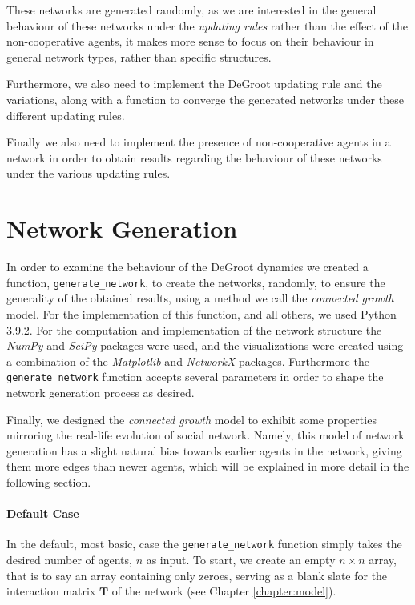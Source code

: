 \documentclass[a4paper, 12pt]{report}
\newcommand{\T}{\bm{T}}
\begin{document}
These networks are generated randomly, as we are interested in the general behaviour of these networks under the \emph{updating rules} rather than the effect of the non-cooperative agents, it makes more sense to focus on their behaviour in general network types, rather than specific structures.

Furthermore, we also need to implement the DeGroot updating rule and the variations, along with a function to converge the generated networks under these different updating rules.

Finally we also need to implement the presence of non-cooperative agents in a network in order to obtain results regarding the behaviour of these networks under the various updating rules. 
\section{Network Generation}
\label{generation:random}

In order to examine the behaviour of the DeGroot dynamics we created a function, \texttt{generate\_network}, to create the networks, randomly, to ensure the generality of the obtained results, using a method we call the \emph{connected growth} model. For the implementation of this function, and all others, we used Python 3.9.2. For the computation and implementation of the network structure the \emph{NumPy} \parencite{2020NumPy-Array} and \emph{SciPy} \parencite{2020SciPy-NMeth} packages were used, and the visualizations were created using a combination of the \emph{Matplotlib} \parencite{matplotlib} and \emph{NetworkX} \parencite{networkx} packages. Furthermore the \texttt{generate\_network} function accepts several parameters in order to shape the network generation process as desired.

Finally, we designed the \emph{connected growth} model to exhibit some properties mirroring the real-life evolution of social network. Namely, this model of network generation has a slight natural bias towards earlier agents in the network, giving them more edges than newer agents, which will be explained in more detail in the following section.

\paragraph{Default Case}
In the default, most basic, case the \texttt{generate\_network} function simply takes the desired number of agents, $n$ as input. To start, we create an empty $n\times n$ array, that is to say an array containing only zeroes, serving as a blank slate for the interaction matrix $\T$ of the network (see Chapter \ref{chapter:model}). 
\end{document}

